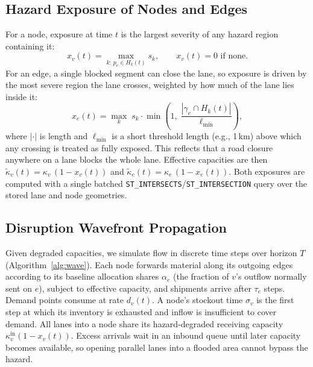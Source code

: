 \documentclass[conference]{IEEEtran}
\begin{document}
\subsection{Hazard Exposure of Nodes and Edges}
For a node, exposure at time $t$ is the largest severity of any hazard
region containing it:
\begin{equation}
x_v(t) = \max_{k:\,p_v\in H_k(t)} s_k, \qquad x_v(t)=0 \text{ if none.}
\end{equation}
For an edge, a single blocked segment can close the lane, so exposure is
driven by the most severe region the lane crosses, weighted by how much
of the lane lies inside it:
\begin{equation}
x_e(t) = \max_{k}\; s_k \cdot
\min\!\left(1,\; \frac{|\gamma_e\cap H_k(t)|}{\ell_{\min}}\right),
\end{equation}
where $|\cdot|$ is length and $\ell_{\min}$ is a short threshold length
(e.g., 1\,km) above which any crossing is treated as fully exposed. This
reflects that a road closure anywhere on a lane blocks the whole lane.
Effective capacities are then
$\tilde\kappa_v(t)=\kappa_v\,(1-x_v(t))$ and
$\tilde\kappa_e(t)=\kappa_e\,(1-x_e(t))$. Both exposures are computed
with a single batched \texttt{ST\_INTERSECTS}/\texttt{ST\_INTERSECTION}
query over the stored lane and node geometries.

\subsection{Disruption Wavefront Propagation}\label{sec:wave}
Given degraded capacities, we simulate flow in discrete time steps over
horizon $T$ (Algorithm~\ref{alg:wave}). Each node forwards material
along its outgoing edges according to its baseline allocation shares
$\alpha_e$ (the fraction of $v$'s outflow normally sent on $e$), subject to
effective capacity, and shipments arrive after $\tau_e$ steps. Demand
points consume at rate $d_v(t)$. A node's stockout time $\sigma_v$ is
the first step at which its inventory is exhausted and inflow is
insufficient to cover demand. All lanes into a node share its
hazard-degraded receiving capacity $\kappa^{\mathrm{in}}_v(1-x_v(t))$.
Excess arrivals wait in an inbound queue until later capacity becomes
available, so opening parallel lanes into a flooded area cannot bypass the
hazard.
\end{document}
